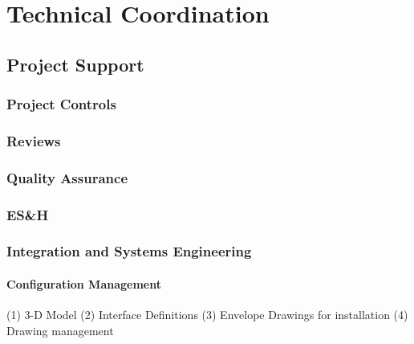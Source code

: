 \chapter{Technical Coordination}
\label{ch:fddp-coord}

\section{Project Support}
\label{sec:fddp-coord-supp}


\subsection{Project Controls}
\label{sec:fddp-coord-controls}


\subsection{Reviews}
\label{sec:fddp-coord-reviews}


\subsection{Quality Assurance}
\label{sec:fddp-coord-qa}


\subsection{ES\&H}
\label{sec:fddp-coord-esh}


\subsection{Integration and Systems Engineering }
\label{sec:fddp-coord-integ-sysengr}

\subsubsection{Configuration Management}
\label{sec:fddp-coord-integ-config}
  	
   (1)	3-D Model
   (2)	Interface Definitions
   (3)	Envelope Drawings for installation
   (4)	Drawing management

